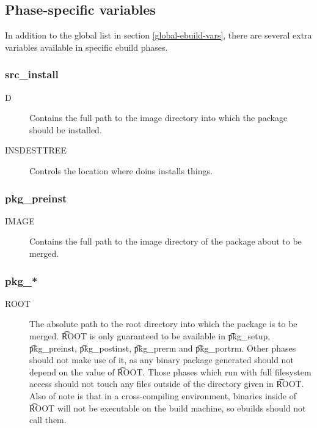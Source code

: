 
\subsection{Phase-specific variables}

In addition to the global list in section \ref{global-ebuild-vars}, there are several extra
variables available in specific ebuild phases.

\subsubsection{src\_install}
\begin{description}
\item[D] Contains the full path to the image directory into which the package should be installed.
\item[INSDESTTREE] Controls the location where doins installs things.
\end{description}

\subsubsection{pkg\_preinst}
\begin{description}
\item[IMAGE] Contains the full path to the image directory of the package about to be merged.
\end{description}

\subsubsection{pkg\_*}
\begin{description}
\item[ROOT] The absolute path to the root directory into which the package is to be merged. \t{ROOT}
    is only guaranteed to be available in \t{pkg\_setup}, \t{pkg\_preinst}, \t{pkg\_postinst},
    \t{pkg\_prerm} and \t{pkg\_portrm}. Other phases should not make use of it, as any binary
    package generated should not depend on the value of \t{ROOT}. Those phases which run with full
    filesystem access should not touch any files outside of the directory given in \t{ROOT}. Also of
    note is that in a cross-compiling environment, binaries inside of \t{ROOT} will not be
    executable on the build machine, so ebuilds should not call them.
\end{description}

